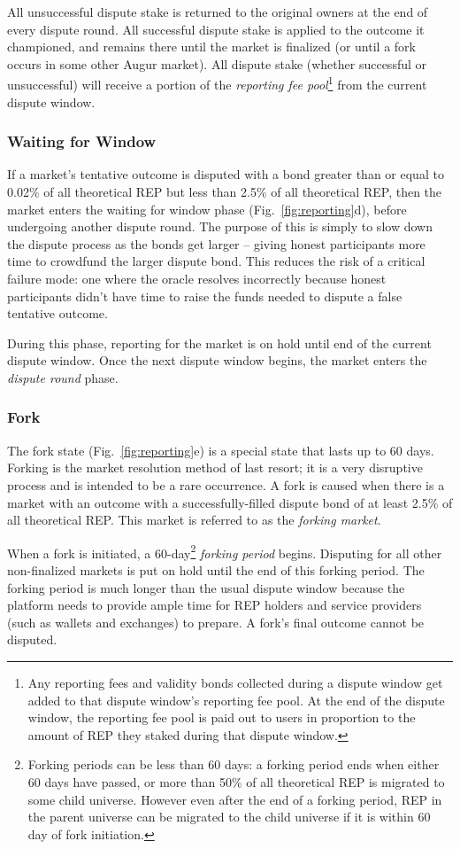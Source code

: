 \documentclass[floatfix,reprint,nofootinbib,amsmath,amssymb,epsfig,pre,floats,letterpaper,groupedaffiliation]{revtex4-1}
\theoremstyle{definition}
\theoremstyle{definition}
\begin{document}
All unsuccessful dispute stake is returned to the original owners at the end of every dispute round.  All successful dispute stake is applied to the outcome it championed, and remains there until the market is finalized (or until a fork occurs in some other Augur market).  All dispute stake (whether successful or unsuccessful) will receive a portion of the \textit{reporting fee pool}\footnote{Any reporting fees and validity bonds collected during a dispute window get added to that dispute window's reporting fee pool.  At the end of the dispute window, the reporting fee pool is paid out to users in proportion to the amount of REP they staked during that dispute window.} from the current dispute window.

\subsubsection{Waiting for Window}

If a market's tentative outcome is disputed with a bond greater than or equal to 0.02\% of all theoretical REP but less than 2.5\% of all theoretical REP, then the market enters the waiting for window phase (Fig.~\ref{fig:reporting}d), before undergoing another dispute round. The purpose of this is simply to slow down the dispute process as the bonds get larger -- giving honest participants more time to crowdfund the larger dispute bond. This reduces the risk of a critical failure mode: one where the oracle resolves incorrectly because honest participants didn't have time to raise the funds needed to dispute a false tentative outcome.

During this phase, reporting for the market is on hold until end of the current dispute window.  Once the next dispute window begins, the market enters the \textit{dispute round} phase.

\subsubsection{Fork}\label{section:fork}

The fork state (Fig.~\ref{fig:reporting}e) is a special state that lasts up to 60 days.  Forking is the market resolution method of last resort; it is a very disruptive process and is intended to be a rare occurrence.  A fork is caused when there is a market with an outcome with a successfully-filled dispute bond of at least 2.5\% of all theoretical REP.  This market is referred to as the \textit{forking market}.

When a fork is initiated, a 60-day\footnote{Forking periods can be less than 60 days: a forking period ends when either 60 days have passed, or more than 50\% of all theoretical REP is migrated to some child universe. However even after the end of a forking period, REP in the parent universe can be migrated to the child universe if it is within 60 day of fork initiation.} \textit{forking period} begins.  Disputing for all other non-finalized markets is put on hold until the end of this forking period.  The forking period is much longer than the usual dispute window because the platform needs to provide ample time for REP holders and service providers (such as wallets and exchanges) to prepare.  A fork's final outcome cannot be disputed.
\end{document}
